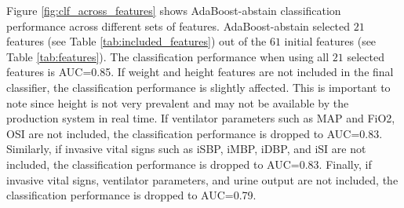\documentclass[
   technote
]{phildoc}
\newcommand{\tab}{Table}
\begin{document}
Figure \ref{fig:clf_across_features} shows AdaBoost-abstain classification performance across different sets of features. AdaBoost-abstain selected $21$ features (see \tab{} \ref{tab:included_features}) out of the $61$ initial features (see \tab{} \ref{tab:features}). The classification performance when using all $21$ selected features is AUC=0.85. If weight and height features are not included in the final classifier, the classification performance is slightly affected. This is important to note since height is not very prevalent and may not be available by the production system in real time. If ventilator parameters such as MAP and FiO2, OSI are not included, the classification performance is dropped to AUC=0.83. Similarly, if invasive vital signs such as iSBP, iMBP, iDBP, and iSI are not included, the classification performance is dropped to AUC=0.83. Finally, if invasive vital signs, ventilator parameters, and urine output are not included, the classification performance is dropped to AUC=0.79.
\end{document}
